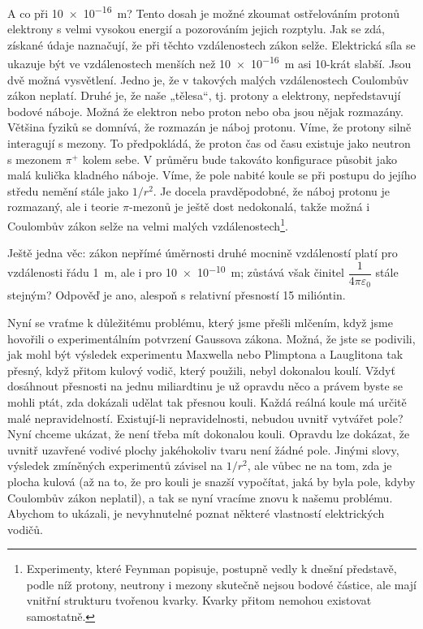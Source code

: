       A co při \SI{10e-16}{\meter}? Tento dosah je možné zkoumat ostřelováním protonů elektrony s velmi 
      vysokou energií a pozorováním jejich rozptylu. Jak se zdá, získané údaje naznačují, že při těchto 
      vzdálenostech zákon selže. Elektrická síla se ukazuje být ve vzdálenostech menších než 
      \SI{10e-16}{\meter} asi 10-krát slabší. Jsou dvě možná vysvětlení. Jedno je, že v takových malých 
      vzdálenostech Coulombův zákon neplatí. Druhé je, že naše „tělesa“, tj. protony a elektrony, 
      nepředstavují bodové náboje. Možná že elektron nebo proton nebo oba jsou nějak rozmazány. Většina 
      fyziků se domnívá, že rozmazán je náboj protonu. Víme, že protony silně interagují s mezony. To 
      předpokládá, že proton čas od času existuje jako neutron s mezonem \(\pi^+\) kolem sebe. V průměru bude 
      takováto konfigurace působit jako malá kulička kladného náboje. Víme, že pole nabité koule se při 
      postupu do jejího středu nemění stále jako \(1/r^2\). Je docela pravděpodobné, že náboj protonu je 
      rozmazaný, ale i teorie \(\pi\text{-mezonů}\) je ještě dost nedokonalá, takže možná i Coulombův zákon 
      selže na velmi malých vzdálenostech\footnote{Experimenty, které Feynman popisuje, postupně vedly k 
      dnešní představě, podle níž protony, neutrony i mezony skutečně nejsou bodové částice, ale mají vnitřní 
      strukturu tvořenou kvarky. Kvarky přitom nemohou existovat samostatně.}.
      
      Ještě jedna věc: zákon nepřímé úměrnosti druhé mocnině vzdáleností platí pro vzdálenosti řádu 
      \SI{1}{\meter}, ale i pro \SI{10e-10}{\meter}; zůstává však činitel \(\dfrac{1}{4\pi\varepsilon_0}\) 
      stále stejným? Odpověď je ano, alespoň s relativní přesností 15 milióntin.
      
      Nyní se vraťme k důležitému problému, který jsme přešli mlčením, když jsme hovořili o experimentálním 
      potvrzení Gaussova zákona. Možná, že jste se podivili, jak mohl být výsledek experimentu Maxwella nebo 
      Plimptona a Lauglitona tak přesný, když přitom kulový vodič, který použili, nebyl dokonalou koulí. 
      Vždyť dosáhnout přesnosti na jednu miliardtinu je už opravdu něco a právem byste se mohli ptát, zda 
      dokázali udělat tak přesnou kouli. Každá reálná koule má určitě malé nepravidelností. Existují-li 
      nepravidelnosti, nebudou uvnitř vytvářet pole? Nyní chceme ukázat, že není třeba mít dokonalou kouli. 
      Opravdu lze dokázat, že uvnitř uzavřené vodivé plochy jakéhokoliv tvaru není žádné pole. Jinými slovy, 
      výsledek zmíněných experimentů závisel na \(1/r^2\), ale vůbec ne na tom, zda je plocha kulová (až na 
      to, že pro kouli je snazší vypočítat, jaká by byla pole, kdyby Coulombův zákon neplatil), a tak se nyní 
      vracíme znovu k našemu problému. Abychom to ukázali, je nevyhnutelné poznat některé vlastností 
      elektrických vodičů.
      
